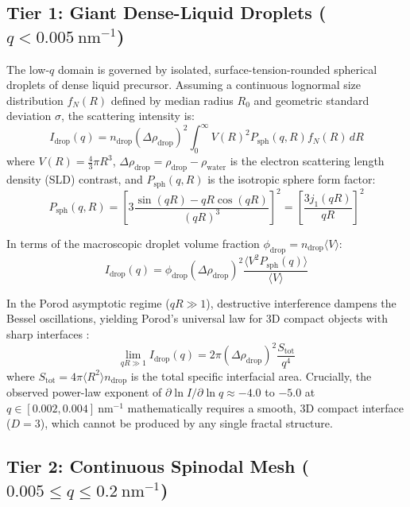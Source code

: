 \documentclass[11pt,a4paper]{article}
\begin{document}
\subsection{Tier 1: Giant Dense-Liquid Droplets ($q < 0.005\ \mathrm{nm}^{-1}$)}

The low-$q$ domain is governed by isolated, surface-tension-rounded spherical droplets of dense liquid precursor. Assuming a continuous lognormal size distribution $f_N(R)$ defined by median radius $R_0$ and geometric standard deviation $\sigma$, the scattering intensity is:
\begin{equation}
I_{\mathrm{drop}}(q) = n_{\mathrm{drop}} (\Delta \rho_{\mathrm{drop}})^2 \int_0^\infty V(R)^2 P_{\mathrm{sph}}(q, R) f_N(R) \, dR
\label{eq:Idrop}
\end{equation}
where $V(R) = \frac{4}{3}\pi R^3$, $\Delta \rho_{\mathrm{drop}} = \rho_{\mathrm{drop}} - \rho_{\mathrm{water}}$ is the electron scattering length density (SLD) contrast, and $P_{\mathrm{sph}}(q, R)$ is the isotropic sphere form factor:
\begin{equation}
P_{\mathrm{sph}}(q, R) = \left[ 3 \frac{\sin(qR) - qR\cos(qR)}{(qR)^3} \right]^2 = \left[ \frac{3 j_1(qR)}{qR} \right]^2
\end{equation}

In terms of the macroscopic droplet volume fraction $\phi_{\mathrm{drop}} = n_{\mathrm{drop}} \langle V \rangle$:
\begin{equation}
I_{\mathrm{drop}}(q) = \phi_{\mathrm{drop}} (\Delta \rho_{\mathrm{drop}})^2 \frac{\langle V^2 P_{\mathrm{sph}}(q) \rangle}{\langle V \rangle}
\end{equation}

In the Porod asymptotic regime ($q R \gg 1$), destructive interference dampens the Bessel oscillations, yielding Porod's universal law for 3D compact objects with sharp interfaces \cite{porod1951die}:
\begin{equation}
\lim_{qR \gg 1} I_{\mathrm{drop}}(q) = 2\pi (\Delta \rho_{\mathrm{drop}})^2 \frac{S_{\mathrm{tot}}}{q^4}
\label{eq:porod}
\end{equation}
where $S_{\mathrm{tot}} = 4\pi \langle R^2 \rangle n_{\mathrm{drop}}$ is the total specific interfacial area. Crucially, the observed power-law exponent of $\partial \ln I / \partial \ln q \approx -4.0$ to $-5.0$ at $q \in [0.002, 0.004]\ \mathrm{nm}^{-1}$ mathematically requires a smooth, 3D compact interface ($D=3$), which cannot be produced by any single fractal structure.

\subsection{Tier 2: Continuous Spinodal Mesh ($0.005 \le q \le 0.2\ \mathrm{nm}^{-1}$)}
\end{document}
